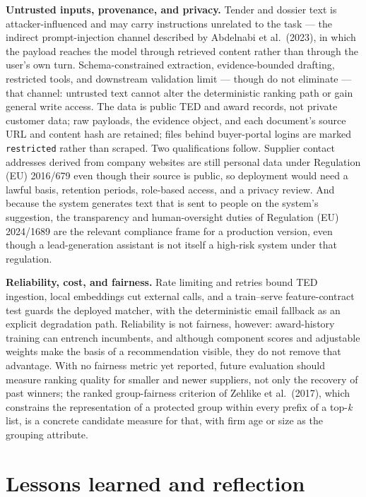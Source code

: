 \textbf{Untrusted inputs, provenance, and privacy.} Tender and dossier text is
attacker-influenced and may carry instructions unrelated to the task --- the indirect
prompt-injection channel described by Abdelnabi et al.\ (2023), in which the payload
reaches the model through retrieved content rather than through the user's own turn.
Schema-constrained extraction, evidence-bounded drafting, restricted tools, and
downstream validation limit --- though do not eliminate --- that channel: untrusted
text cannot alter the deterministic ranking path or gain general write access. The data
is public TED and award records, not private customer data; raw payloads, the evidence
object, and each document's source URL and content hash are retained; files behind
buyer-portal logins are marked \texttt{restricted} rather than scraped. Two
qualifications follow. Supplier contact addresses derived from company websites are
still personal data under Regulation (EU) 2016/679 even though their source is public,
so deployment would need a lawful basis, retention periods, role-based access, and a
privacy review. And because the system generates text that is sent to people on the
system's suggestion, the transparency and human-oversight duties of Regulation (EU)
2024/1689 are the relevant compliance frame for a production version, even though a
lead-generation assistant is not itself a high-risk system under that regulation.

\textbf{Reliability, cost, and fairness.} Rate limiting and retries bound TED
ingestion, local embeddings cut external calls, and a train--serve feature-contract
test guards the deployed matcher, with the deterministic email fallback as an explicit
degradation path. Reliability is not fairness, however: award-history training can
entrench incumbents, and although component scores and adjustable weights make the
basis of a recommendation visible, they do not remove that advantage. With no fairness
metric yet reported, future evaluation should measure ranking quality for smaller and
newer suppliers, not only the recovery of past winners; the ranked group-fairness
criterion of Zehlike et al.\ (2017), which constrains the representation of a protected
group within every prefix of a top-\textit{k} list, is a concrete candidate measure for
that, with firm age or size as the grouping attribute.

\section{Lessons learned and reflection}

